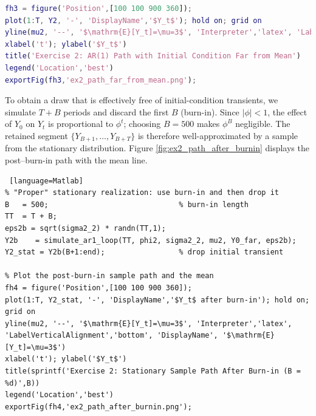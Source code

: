 \documentclass[dvipsnames,11pt]{article}
\begin{document}
\begin{solution}
\begin{lstlisting}[language=Matlab]
% Plot the sample path and the unconditional mean
fh3 = figure('Position',[100 100 900 360]);
plot(1:T, Y2, '-', 'DisplayName','$Y_t$'); hold on; grid on
yline(mu2, '--', '$\mathrm{E}[Y_t]=\mu=3$', 'Interpreter','latex', 'LabelVerticalAlignment','bottom', 'DisplayName', '$\mathrm{E}[Y_t]=\mu=3$')
xlabel('t'); ylabel('$Y_t$')
title('Exercise 2: AR(1) Path with Initial Condition Far from Mean')
legend('Location','best')
exportFig(fh3,'ex2_path_far_from_mean.png');
\end{lstlisting}

                To obtain a draw that is effectively free of initial-condition transients, we simulate $T+B$ periods and discard the first $B$ (burn-in). Since $|\phi|<1$, the effect of $Y_0$ on $Y_t$ is proportional to $\phi^t$; choosing $B=500$ makes $\phi^B$ negligible. The retained segment $\{Y_{B+1},\dots,Y_{B+T}\}$ is therefore well-approximated by a sample from the stationary distribution. Figure \ref{fig:ex2_path_after_burnin} displays the post--burn-in path with the mean line.

\begin{lstlisting} [language=Matlab]
% "Proper" stationary realization: use burn-in and then drop it
B   = 500;                              % burn-in length
TT  = T + B;
eps2b = sqrt(sigma2_2) * randn(TT,1);
Y2b    = simulate_ar1_loop(TT, phi2, sigma2_2, mu2, Y0_far, eps2b);
Y2_stat = Y2b(B+1:end);                 % drop initial transient

% Plot the post-burn-in sample path and the mean
fh4 = figure('Position',[100 100 900 360]);
plot(1:T, Y2_stat, '-', 'DisplayName','$Y_t$ after burn-in'); hold on; grid on
yline(mu2, '--', '$\mathrm{E}[Y_t]=\mu=3$', 'Interpreter','latex', 'LabelVerticalAlignment','bottom', 'DisplayName', '$\mathrm{E}[Y_t]=\mu=3$')
xlabel('t'); ylabel('$Y_t$')
title(sprintf('Exercise 2: Stationary Sample Path After Burn-in (B = %d)',B))
legend('Location','best')
exportFig(fh4,'ex2_path_after_burnin.png');
\end{lstlisting}


\end{solution}
\end{document}
